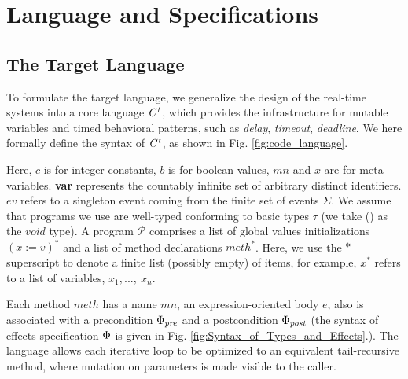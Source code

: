 \documentclass[acmsmall,10pt,review]{acmart}
\newcommand{\effect}{\textcolor{black}{\ensuremath{\mathrm{\Phi}}}}
\newcommand{\anyevent}[1]{{\textcolor{darkred}
{{\textbf{\footnotesize #1}}}}}
\newcommand{\code}[1]{{\tt{\ensuremath{\m{#1}}}}}
\newcommand{\m}{\mathit}
\newcommand\figref[1]{Fig. \textcolor{black}{\ref{#1}}.}
\newcommand{\timedL}{\code{C^{t}}}
\begin{document}
{\section{Language and Specifications}
\label{sec:LanguageSpecifications}

\subsection{The Target Language}
\label{subsec:Targetlanguage}

To formulate the target language, we generalize the design of the real-time systems
 into a core language \code{\timedL}, 
 which provides the infrastructure for mutable variables and timed behavioral patterns, 
 such as \emph{delay}, \emph{timeout}, \emph{deadline}. 
We here formally define the syntax of \code{\timedL}, as shown in \figref{fig:code_language} 


Here, \code{c} is for integer constants, \code{b} is for boolean values, 
 \code{mn} and \code{x} are for meta-variables.  
 \textbf{var} represents the countably infinite set of arbitrary distinct identifiers. 
\code{ev} refers to a singleton event coming from the finite 
set of events \code{\Sigma}. 
We assume that programs we use are well-typed conforming to basic types \code{\tau} (we take () as the \code{void} type).
A program \code{\mathcal{P}} comprises a list of 
global values initializations \code{(x:=v)^*} and 
a list of 
method declarations \code{{meth^*}}. 
Here, we use the \code{*} superscript to denote a finite list (possibly empty) of items, for example, \code{{x^*}} refers to a list of variables, \code{x_1, ...,\ x_n}. 


Each method \code{meth} has a name \code{mn}, an expression-oriented body \code{e}, also is associated with a precondition  \code{\effect_{pre}} and a postcondition \code{\effect_{post}} (the syntax of effects specification \code{\effect} is given in \figref{fig:Syntax_of_Types_and_Effects}).
The language allows each iterative loop to be optimized to an equivalent 
tail-recursive method, where mutation on parameters is made visible 
to the caller. 

}
\end{document}
